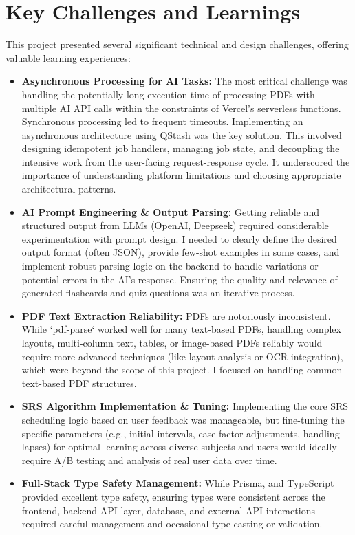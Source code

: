 \documentclass[
	letterpaper,
	11pt
]{jdf}
\begin{document}
\section{Key Challenges and Learnings}

This project presented several significant technical and design challenges, offering valuable learning experiences:

\begin{itemize}
    \item \textbf{Asynchronous Processing for AI Tasks:} The most critical challenge was handling the potentially long execution time of processing PDFs with multiple AI API calls within the constraints of Vercel's serverless functions. Synchronous processing led to frequent timeouts. Implementing an asynchronous architecture using QStash was the key solution. This involved designing idempotent job handlers, managing job state, and decoupling the intensive work from the user-facing request-response cycle. It underscored the importance of understanding platform limitations and choosing appropriate architectural patterns.
    \item \textbf{AI Prompt Engineering \& Output Parsing:} Getting reliable and structured output from LLMs (OpenAI, Deepseek) required considerable experimentation with prompt design. I needed to clearly define the desired output format (often JSON), provide few-shot examples in some cases, and implement robust parsing logic on the backend to handle variations or potential errors in the AI's response. Ensuring the quality and relevance of generated flashcards and quiz questions was an iterative process.
    \item \textbf{PDF Text Extraction Reliability:} PDFs are notoriously inconsistent. While `pdf-parse` worked well for many text-based PDFs, handling complex layouts, multi-column text, tables, or image-based PDFs reliably would require more advanced techniques (like layout analysis or OCR integration), which were beyond the scope of this project. I focused on handling common text-based PDF structures.
    \item \textbf{SRS Algorithm Implementation \& Tuning:} Implementing the core SRS scheduling logic based on user feedback was manageable, but fine-tuning the specific parameters (e.g., initial intervals, ease factor adjustments, handling lapses) for optimal learning across diverse subjects and users would ideally require A/B testing and analysis of real user data over time.
    \item \textbf{Full-Stack Type Safety Management:} While Prisma, and TypeScript provided excellent type safety, ensuring types were consistent across the frontend, backend API layer, database, and external API interactions required careful management and occasional type casting or validation.
\end{itemize}
\end{document}
